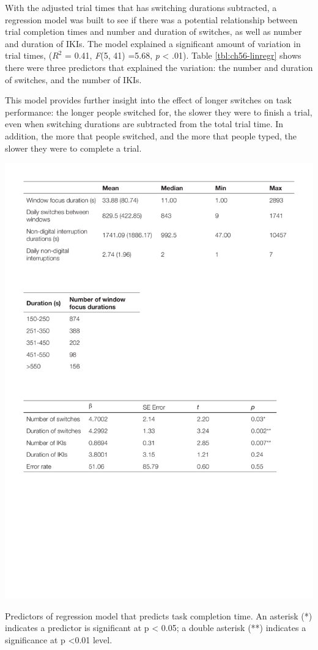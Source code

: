 With the adjusted trial times that has switching durations subtracted, a regression model was built to see if there was a potential relationship between trial completion times and number and duration of switches, as well as number and duration of IKIs. The model explained a significant amount of variation in trial times, ($R^2$ = 0.41, \textit{F}(5, 41) =5.68, \textit{p} < .01). Table \ref{tbl:ch56-linregr} shows there were three predictors that explained the variation: the number and duration of switches, and the number of IKIs. 

This model provides further insight into the effect of longer switches on task performance: the longer people switched for, the slower they were to finish a trial, even when switching durations are subtracted from the total trial time. In addition, the more that people switched, and the more that people typed, the slower they were to complete a trial.

\begin{table}
\centering
\centerline{\includegraphics[scale=0.8]{images/ch56/ch56-linregr.pdf}}
\caption[Study 6 regression model to predict task completion time]{Predictors of regression model that predicts task completion time. An asterisk (*) indicates a predictor is significant at p < 0.05; a double asterisk (**) indicates a significance at p <0.01 level.}
\label{tbl:ch56-linregr}
\end{table}

